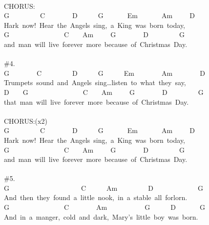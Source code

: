 \documentclass[]{book}
\begin{document}
\hspace*{0.333em}\hspace*{0.333em}\\
CHORUS:\\
G~~~~~~~~~C~~~~~~~~D~~~~~~G~~~~~~~Em~~~~~~~Am~~~~~D~\\
Hark~now!~Hear~the~Angels~sing,~a~King~was~born~today,~\\
\hspace*{0.333em}\hspace*{0.333em}\hspace*{0.333em}\hspace*{0.333em}G~~~~~~~~~~~~~~~~C~~~~Am~~~~~G~~~~~~~~D~~~~~~~~~G~\\
and~man~will~live~forever~more~because~of~Christmas~Day.~\\
~\\
\#4.~\\
G~~~~~~~~C~~~~~~~~~D~~~~~~G~~~~~~Em~~~~~~~~Am~~~~~~~~D~\\
Trumpets~sound~and~Angels~sing\ldots listen~to~what~they~say,~\\
D~~~~G~~~~~~~~~~~~~~~~C~~~~Am~~~~~G~~~~~~~~D~~~~~~~~~G~\\
that~man~will~live~forever~more~because~of~Christmas~Day.~\\
~\\
CHORUS:(x2)\\
G~~~~~~~~~C~~~~~~~~D~~~~~~G~~~~~~~Em~~~~~~~Am~~~~~D~\\
Hark~now!~Hear~the~Angels~sing,~a~King~was~born~today,~\\
\hspace*{0.333em}\hspace*{0.333em}\hspace*{0.333em}\hspace*{0.333em}G~~~~~~~~~~~~~~~~C~~~~Am~~~~~G~~~~~~~~D~~~~~~~~~G~\\
and~man~will~live~forever~more~because~of~Christmas~Day.~\\
\hspace*{0.333em}\hspace*{0.333em}\\
\#5.~~~\\
G~~~~~~~~~~~~~~~~~~~~~C~~~~~~Am~~~~~~~~~D~~~~~~~~~~~~~G~\\
And~then~they~found~a~little~nook,~in~a~stable~all~forlorn.~\\
G~~~~~~~~~~~~~~~~C~~~~~~~~Am~~~~~~~~~~~G~~~~~~D~~~~~~~G~\\
And~in~a~manger,~cold~and~dark,~Mary's~little~boy~was~born.\\
\end{document}
